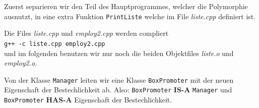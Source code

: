 Zuerst separieren wir den Teil des Hauptprogrammes, welcher die
Polymorphie ausnutzt, in eine extra Funktion \texttt{PrintListe} welche im
File \textit{liste.cpp}  definiert ist.
%

%
Die Files \textit{liste.cpp} und \textit{employ2.cpp} werden compliert
\\
\verb|g++ -c liste.cpp employ2.cpp|
\\
und im folgenden benutzen wir nur noch die beiden Objektfiles
\textit{liste.o} und \textit{employ2.o}.

Von der Klasse \verb|Manager| leiten wir eine Klasse \verb|BoxPromoter|
mit der neuen Eigenschaft der Bestechlichkeit ab.
Also: \verb|BoxPromoter|  \textbf{IS-A} \verb|Manager| und \verb|BoxPromoter|
\textbf{HAS-A} Eigenschaft der Bestechlichkeit.
%

